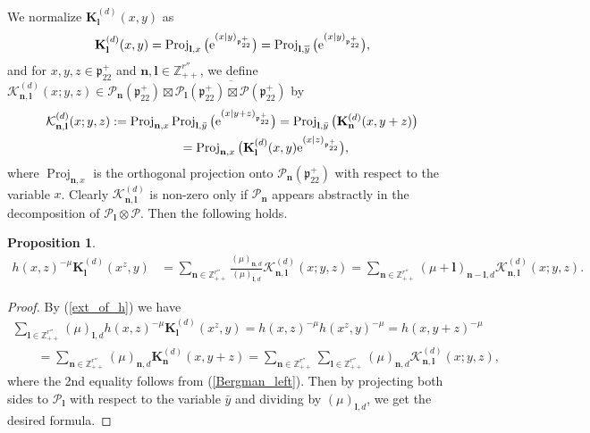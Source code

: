 \documentclass[pdftex]{sigma}
\numberwithin{equation}{section}
\newtheorem{Proposition}[Theorem]{Proposition}
{ \theoremstyle{definition}
\newtheorem{Definition}[Theorem]{Definition}
\newtheorem{Note}[Theorem]{Note}
\newtheorem{Example}[Theorem]{Example}
\newtheorem{Remark}[Theorem]{Remark} }
\newcommand{\bK}{\mathbf{K}}
\newcommand{\bl}{\mathbf{l}}
\newcommand{\bn}{\mathbf{n}}
\newcommand{\BZ}{\mathbb{Z}}
\newcommand{\fp}{\mathfrak{p}}
\newcommand{\cK}{\mathcal{K}}
\newcommand{\cP}{\mathcal{P}}
\newcommand{\Proj}{\operatorname{Proj}}
\begin{document}
We normalize $\bK_\bl^{(d)}(x,y)$ as
\begin{gather*} \bK_\bl^{(d)}(x,y)=\Proj_{\bl,x}\big({\rm e}^{(x|y)_{\fp^+_{22}}}\big)=\Proj_{\bl,\overline{y}}\big({\rm e}^{(x|y)_{\fp^+_{22}}}\big), \end{gather*}
and for $x,y,z\in\fp^+_{22}$ and $\bn,\bl\in\BZ_{++}^{r''}$, we define
$\cK_{\bn,\bl}^{(d)}(x;y,z)\in\cP_\bn(\fp^+_{22})\boxtimes\overline{\cP_\bl(\fp^+_{22})\boxtimes\cP(\fp^+_{22})}$ by
\begin{gather*}
\cK_{\bn,\bl}^{(d)}(x;y,z) :=\Proj_{\bn,x}\Proj_{\bl,\bar{y}}\big({\rm e}^{(x|y+z)_{\fp^+_{22}}}\big)
 =\Proj_{\bl,\bar{y}}\big(\bK_\bn^{(d)}(x,y+z)\big) \\
 \hphantom{\cK_{\bn,\bl}^{(d)}(x;y,z)}{}
 =\Proj_{\bn,x}\big(\bK_\bl^{(d)}(x,y){\rm e}^{(x|z)_{\fp^+_{22}}}\big),
\end{gather*}
where $\Proj_{\bn,x}$ is the orthogonal projection onto $\cP_\bn(\fp^+_{22})$ with respect to the variable $x$.
Clearly $\cK_{\bn,\bl}^{(d)}$ is non-zero only if $\cP_\bn$ appears abstractly in the decomposition of $\cP_\bl\otimes\cP$.
Then the following holds.
\begin{Proposition}
\begin{align*}
h(x,z)^{-\mu}\bK_\bl^{(d)}(x^z,y)
&=\sum_{\bn\in\BZ_{++}^{r''}}\frac{(\mu)_{\bn,d}}{(\mu)_{\bl,d}}\cK_{\bn,\bl}^{(d)}(x;y,z)
=\sum_{\bn\in\BZ_{++}^{r''}}(\mu+\bl)_{\bn-\bl,d}\cK_{\bn,\bl}^{(d)}(x;y,z).
\end{align*}
\end{Proposition}
\begin{proof}
By (\ref{ext_of_h}) we have
\begin{gather*}
 \sum_{\bl\in\BZ_{++}^{r''}}(\mu)_{\bl,d}h(x,z)^{-\mu}\bK_\bl^{(d)}(x^z,y)
=h(x,z)^{-\mu}h(x^z,y)^{-\mu}=h(x,y+z)^{-\mu}\\
\qquad{} =\sum_{\bn\in\BZ_{++}^{r''}}(\mu)_{\bn,d}\bK_\bn^{(d)}(x,y+z)
=\sum_{\bn\in\BZ_{++}^{r''}}\sum_{\bl\in\BZ_{++}^{r''}}(\mu)_{\bn,d}\cK_{\bn,\bl}^{(d)}(x;y,z),
\end{gather*}
where the 2nd equality follows from (\ref{Bergman_left}). Then by projecting both sides to $\cP_\bl$ with respect to the variable $\bar{y}$ and dividing by $(\mu)_{\bl,d}$, we get the desired formula.
\end{proof}
\end{document}
